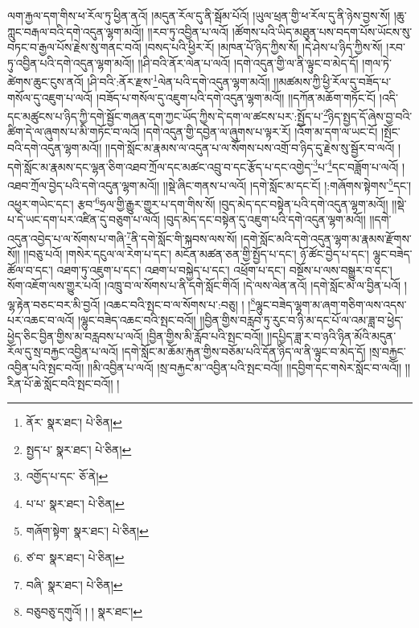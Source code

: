 ལག་རྐྱལ་དག་གིས་ཕ་རོལ་ཏུ་ཕྱིན་ནའོ། །མདུན་རོལ་དུ་ནི་སྦོམ་པོའོ། །ཡུལ་ཕྲན་གྱི་ཕ་རོལ་དུ་ནི་ཉེས་བྱས་སོ། །ཆུ་ཀླུང་བརྒལ་བའི་དགེ་འདུན་ལྷག་མའོ།། །།རབ་ཏུ་འབྱིན་པ་ལའོ། །ཚོགས་པའི་ཡིད་མཐུན་པས་བདག་པོས་ཡོངས་སུ་བཏང་བ་རྒྱལ་པོས་རྗེས་སུ་གནང་བའོ། །བསད་པའི་ཕྱིར་རོ། །མཁན་པོ་ཉིད་ཀྱིས་སོ། །དེ་ཤེས་པ་ཉིད་ཀྱིས་སོ། །རབ་ཏུ་འབྱིན་པའི་དགེ་འདུན་ལྷག་མའོ།། །།ཤི་བའི་ནོར་ལེན་པ་ལའོ། །དགེ་འདུན་གྱི་ལ་ནི་ལྟུང་བ་མེད་དོ། །གལ་ཏེ་ཚེགས་ཆུང་ངུས་ནའོ། །ཤི་བའི་:ནོར་རྫས་\footnote{ནོར་  སྣར་ཐང་།  པེ་ཅིན། }ལེན་པའི་དགེ་འདུན་ལྷག་མའོ།། །།མཚམས་ཀྱི་ཕྱི་རོལ་དུ་བཟོད་པ་གསོལ་དུ་འཇུག་པ་ལའོ། །བཟོད་པ་གསོལ་དུ་འཇུག་པའི་དགེ་འདུན་ལྷག་མའོ།། །།དཀོན་མཆོག་གཏོང་ངོ། །འདི་དང་མཚུངས་པ་ཉིད་ཀྱི་དགེ་སྦྱོང་གཞན་དག་ཀྱང་ཡོད་ཀྱིས་དེ་དག་ལ་ཚངས་པར་:སྤྱོད་པ་\footnote{སྤྱད་པ་  སྣར་ཐང་།  པེ་ཅིན། }ཉིད་སྤྱད་དོ་ཞེས་བྱ་བའི་ཚིག་དེ་ལ་ཞུགས་པ་མི་གཏོང་བ་ལའོ། །དགེ་འདུན་གྱི་དབྱེན་ལ་ཞུགས་པ་ལྟར་རོ། །འོག་མ་དག་ལ་ཡང་ངོ། །སྤོང་བའི་དགེ་འདུན་ལྷག་མའོ།། །།དགེ་སློང་མ་རྣམས་ལ་འདུན་པ་ལ་སོགས་པས་འགྲོ་བ་ཉིད་དུ་རྗེས་སུ་སྦྱོར་བ་ལའོ། །དགེ་སློང་མ་རྣམས་དང་ལྷན་ཅིག་འཐབ་ཀྲོལ་དང་མཚང་འབྲུ་བ་དང་རྩོད་པ་དང་འགྱེད་\footnote{འགྱོད་པ་དང་  ཅོ་ནེ། }པ་\footnote{པ་པ་  སྣར་ཐང་།  པེ་ཅིན། }དང་བཟློག་པ་ལའོ། །འཐབ་ཀྲོལ་བྱེད་པའི་དགེ་འདུན་ལྷག་མའོ།། །།སྡེ་ཞིང་གནས་པ་ལའོ། །དགེ་སློང་མ་དང་ངོ། །:གཞོགས་སྟེགས་\footnote{གཞོག་སྟེག་  སྣར་ཐང་།  པེ་ཅིན། }དང་། འཕྱར་གཡེང་དང་། རྩབ་\footnote{ཙ་བ་  སྣར་ཐང་།  པེ་ཅིན། }ཧྲལ་གྱི་རྒྱུར་གྱུར་པ་དག་གིས་སོ། །བུད་མེད་དང་བསྟེན་པའི་དགེ་འདུན་ལྷག་མའོ།། །།སྡེ་པ་དེ་ཡང་དག་པར་འཛིན་དུ་བཅུག་པ་ལའོ། །བུད་མེད་དང་བསྟེན་དུ་འཇུག་པའི་དགེ་འདུན་ལྷག་མའོ།། །།དགེ་འདུན་འབྱེད་པ་ལ་སོགས་པ་གཞི་\footnote{བཞི་  སྣར་ཐང་།  པེ་ཅིན། }ནི་དགེ་སློང་གི་སྐབས་ལས་སོ། །དགེ་སློང་མའི་དགེ་འདུན་ལྷག་མ་རྣམས་རྫོགས་སོ།། །།བཅུ་པའོ། །གསེར་དངུལ་ལ་རེག་པ་དང་། མངོན་མཚན་ཅན་གྱི་སྤྱོད་པ་དང་། ཉོ་ཚོང་བྱེད་པ་དང་། ལྷུང་བཟེད་ཚོལ་བ་དང་། འཐག་ཏུ་འཇུག་པ་དང་། འཐག་པ་བསྐྱེད་པ་དང་། འཕྲོག་པ་དང་། བསྔོས་པ་ལས་བསྒྱུར་བ་དང་། སོག་འཇོག་ལས་གྱུར་པའོ། །འཁྲུ་བ་ལ་སོགས་པ་ནི་དགེ་སློང་གིའོ། །དེ་ལས་ལེན་ནའོ། །དགེ་སློང་མ་ལ་བྱིན་པའོ། །ལྷ་རྟེན་བཅང་བར་མི་བྱའོ། །འཆང་བའི་སྤང་བ་ལ་སོགས་པ་:བཅུ། ། །\footnote{བཅུབཅུ་དགུའོ། ། །  སྣར་ཐང་། }ལྷུང་བཟེད་ལྷག་མ་ཞག་གཅིག་ལས་འདས་པར་འཆང་བ་ལའོ། །ལྷུང་བཟེད་འཆང་བའི་སྤང་བའོ།། །།བྱིན་གྱིས་བརླབ་ཏུ་རུང་བ་ཉི་མ་དང་པོ་ལ་འམ་ཟླ་བ་ཕྱེད་ཕྱེད་ཅིང་བྱིན་གྱིས་མ་བརླབས་པ་ལའོ། །བྱིན་གྱིས་མི་རློབ་པའི་སྤང་བའོ།། །།དཔྱིད་ཟླ་ར་བ་ཉའི་ཉིན་མོའི་མདུན་རོལ་དུ་སྲ་བརྐྱང་འབྱིན་པ་ལའོ། །དགེ་སློང་མ་ཆོམ་རྐུན་གྱིས་བཅོམ་པའི་དོན་ཉིད་ལ་ནི་ལྟུང་བ་མེད་དོ། །སྲ་བརྐྱང་འབྱིན་པའི་སྤང་བའོ།། །།མི་འབྱིན་པ་ལའོ། །སྲ་བརྐྱང་མ་་འབྱིན་པའི་སྤང་བའོ།། །།དབྱིག་དང་གསེར་སློང་བ་ལའོ།། །།རིན་པོ་ཆེ་སློང་བའི་སྤང་བའོ།། །
